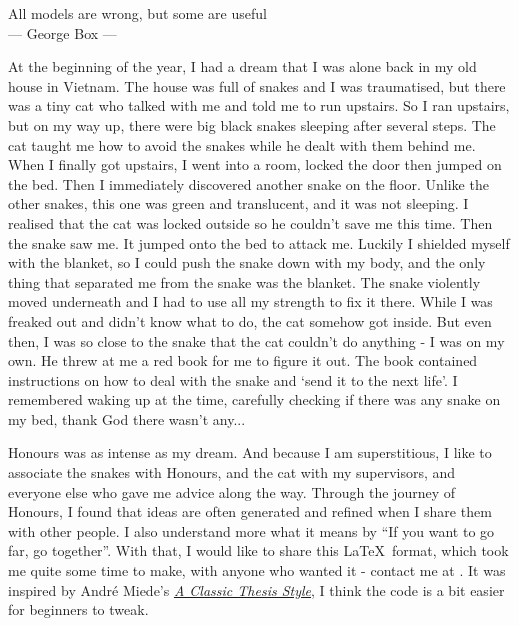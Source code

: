 \thispagestyle{empty}

\vspace*{3cm}

\begin{center}
All models are wrong, but some are useful \\ \medskip
--- George Box ---   
\end{center}

\vspace{2cm}

At the beginning of the year, I had a dream that I was alone back in my old house in Vietnam. The house was full of snakes and I was traumatised, but there was a tiny cat who talked with me and told me to run upstairs. So I ran upstairs, but on my way up, there were big black snakes sleeping after several steps. The cat taught me how to avoid the snakes while he dealt with them behind me. When I finally got upstairs, I went into a room, locked the door then jumped on the bed. Then I immediately discovered another snake on the floor. Unlike the other snakes, this one was green and translucent, and it was not sleeping. I realised that the cat was locked outside so he couldn't save me this time. Then the snake saw me. It jumped onto the bed to attack me. Luckily I shielded myself with the blanket, so I could push the snake down with my body, and the only thing that separated me from the snake was the blanket. The snake violently moved underneath and I had to use all my strength to fix it there. While I was freaked out and didn't know what to do, the cat somehow got inside. But even then, I was so close to the snake that the cat couldn't do anything - I was on my own. He threw at me a red book for me to figure it out. The book contained instructions on how to deal with the snake and `send it to the next life'. I remembered waking up at the time, carefully checking if there was any snake on my bed, thank God there wasn't any...

Honours was as intense as my dream. And because I am superstitious, I like to associate the snakes with Honours, and the cat with my supervisors, and everyone else who gave me advice along the way. Through the journey of Honours, I found that ideas are often generated and refined when I share them with other people. I also understand more what it means by ``If you want to go far, go together''. With that, I would like to share this \LaTeX\ format, which took me quite some time to make, with anyone who wanted it - contact me at  . It was inspired by André Miede's \href{https://bitbucket.org/amiede/classicthesis/wiki/Home}{\textit{A Classic Thesis Style}}, I think the code is a bit easier for beginners to tweak.